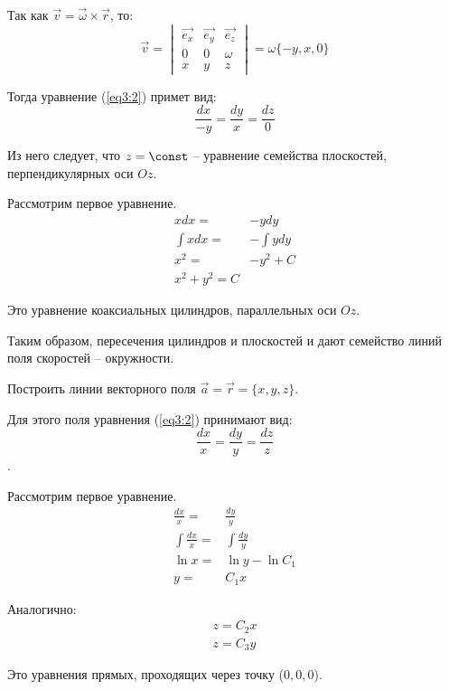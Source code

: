 	\begin{solution}
	Так как \( \vec{v} = \vec{\omega} \times \vec{r} \), то:
	\begin{equation}
		\vec{v} = \begin{vmatrix}
			\vec{e_x}	& \vec{e_y}	& \vec{e_z} \\
			0			& 0				& \omega	 \\
			x 			& y 			& z
		\end{vmatrix} = \omega\{-y, x, 0\} \nonumber
	\end{equation}
	
	Тогда уравнение (\ref{eq3:2}) примет вид:
	\[ \frac{dx}{-y} = \frac{dy}{x} = \frac{dz}{0} \]
	
	Из него следует, что \( z = \const \) -- уравнение семейства плоскостей, перпендикулярных оси \( Oz \).
	
	Рассмотрим первое уравнение.
	\begin{align}
		xdx = & -ydy \nonumber \\
		\int xdx = & -\int ydy  \nonumber \\
		x^2 = & -y^2 + C  \nonumber \\
		x^2 + y^2 = C  \nonumber
	\end{align}
	
	Это уравнение коаксиальных цилиндров, параллельных оси \( Oz \).
	
	Таким образом, пересечения цилиндров и плоскостей и дают семейство линий поля скоростей -- окружности.
	\end{solution}
	
	\begin{example}
	Построить линии векторного поля \( \vec{a} = \vec{r} = \{ x, y, z \} \).
	\end{example}
	
	\begin{solution}
	Для этого поля уравнения (\ref{eq3:2}) принимают вид:
	\[ \frac{dx}{x} = \frac{dy}{y} = \frac{dz}{z} \].
	
	Рассмотрим первое уравнение.
	\begin{align}
		\frac{dx}{x} = & \frac{dy}{y} \nonumber \\
		\int \frac{dx}{x} = & \int \frac{dy}{y} \nonumber \\
		\ln x = & \ln y - \ln C_1 \nonumber \\
		y = & C_1x  \nonumber
	\end{align}
	
	Аналогично:
	\begin{align}
		z = C_2x \nonumber \\
		z = C_3y  \nonumber
	\end{align}
	
	Это уравнения прямых, проходящих через точку (\( 0, 0, 0 \)).
	\end{solution}
	
